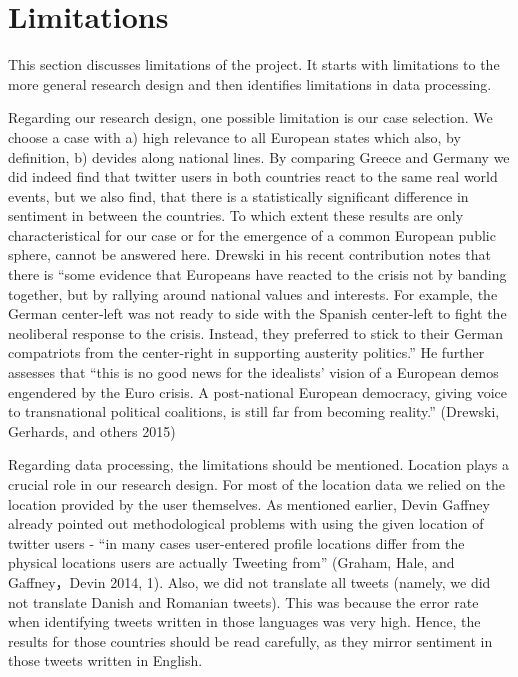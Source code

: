 \documentclass[]{article}
\begin{document}
\newpage

\section{Limitations}\label{limitations}

This section discusses limitations of the project. It starts with
limitations to the more general research design and then identifies
limitations in data processing.

Regarding our research design, one possible limitation is our case
selection. We choose a case with a) high relevance to all European
states which also, by definition, b) devides along national lines. By
comparing Greece and Germany we did indeed find that twitter users in
both countries react to the same real world events, but we also find,
that there is a statistically significant difference in sentiment in
between the countries. To which extent these results are only
characteristical for our case or for the emergence of a common European
public sphere, cannot be answered here. Drewski in his recent
contribution notes that there is ``some evidence that Europeans have
reacted to the crisis not by banding together, but by rallying around
national values and interests. For example, the German center‐left was
not ready to side with the Spanish center‐left to fight the neoliberal
response to the crisis. Instead, they preferred to stick to their German
compatriots from the center‐right in supporting austerity politics.'' He
further assesses that ``this is no good news for the idealists' vision
of a European demos engendered by the Euro crisis. A post‐national
European democracy, giving voice to transnational political coalitions,
is still far from becoming reality.'' (Drewski, Gerhards, and others
2015)

Regarding data processing, the limitations should be mentioned. Location
plays a crucial role in our research design. For most of the location
data we relied on the location provided by the user themselves. As
mentioned earlier, Devin Gaffney already pointed out methodological
problems with using the given location of twitter users - ``in many
cases user-entered profile locations differ from the physical locations
users are actually Tweeting from'' (Graham, Hale, and Gaffney，Devin
2014, 1). Also, we did not translate all tweets (namely, we did not
translate Danish and Romanian tweets). This was because the error rate
when identifying tweets written in those languages was very high. Hence,
the results for those countries should be read carefully, as they mirror
sentiment in those tweets written in English.
\end{document}
